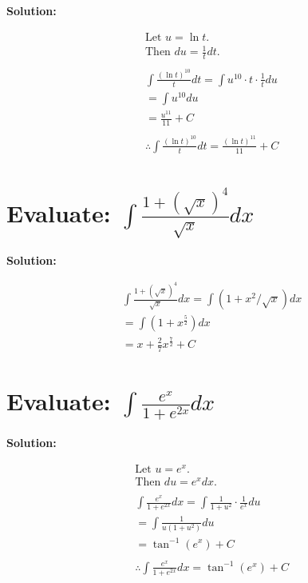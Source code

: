 \documentclass{article}
\begin{document}
\textbf{Solution:}

\begin{align*}
     & \text{Let } u = \ln t.                                                    \\
     & \text{Then } du = \frac{1}{t} dt.                                         \\
    \\
     & \int \frac{(\ln t)^{10}}{t} dt = \int u^{10} \cdot t \cdot \frac{1}{t} du \\
     & = \int u^{10} du                                                          \\
     & = \frac{u^{11}}{11} + C                                                   \\
    \\
     & \therefore \int \frac{(\ln t)^{10}}{t} dt = {\frac{(\ln t)^{11}}{11} + C}
\end{align*}

\section{Evaluate: $\int \frac{1 + (\sqrt{x})^4}{\sqrt{x}} dx$}

\textbf{Solution:}

\begin{align*}
     & \int \frac{1 + (\sqrt{x})^4}{\sqrt{x}} dx = \int (1 + x^2 / \sqrt{x}) dx \\
     & = \int (1 + x^{\frac{5}{2}}) dx                                          \\
     & = x + \frac{2}{7}x^{\frac{7}{2}} + C
\end{align*}

\newpage
\section{Evaluate: $\int \frac{e^x}{1 + e^{2x}} dx$}

\textbf{Solution:}

\begin{align*}
     & \text{Let } u = e^x.                                                           \\
     & \text{Then } du = e^x dx.                                                      \\
    \\
     & \int \frac{e^x}{1 + e^{2x}} dx = \int \frac{1}{1 + u^2} \cdot \frac{1}{e^x} du \\
     & = \int \frac{1}{u(1 + u^2)} du                                                 \\
     & = \tan^{-1}(e^x) + C                                                           \\
    \\
     & \therefore \int \frac{e^x}{1 + e^{2x}} dx = {\tan^{-1}(e^x) + C}
\end{align*}
\end{document}
